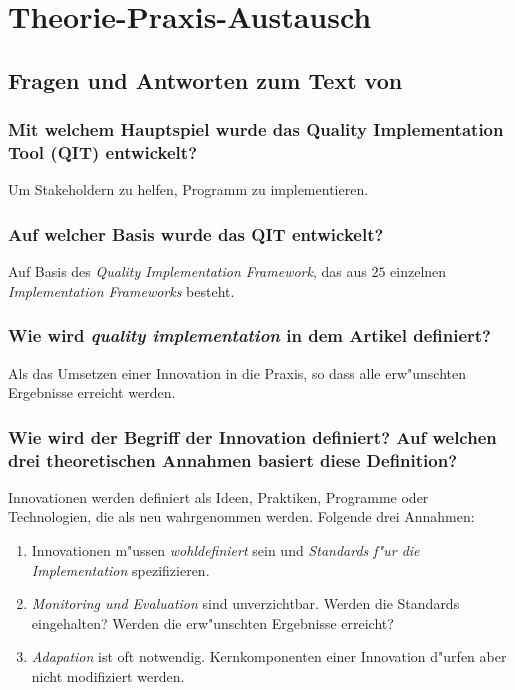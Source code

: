 \section{Theorie-Praxis-Austausch}
\subsection{Fragen und Antworten zum Text von \textcite{meyers_practical_2012}}
\subsubsection{Mit welchem Hauptspiel wurde das Quality Implementation Tool (QIT) entwickelt?}
Um Stakeholdern zu helfen, Programm zu implementieren.

\subsubsection{Auf welcher Basis wurde das QIT entwickelt?}
Auf Basis des \emph{Quality Implementation Framework}, das aus $25$ einzelnen \emph{Implementation Frameworks} besteht.

\subsubsection{Wie wird \emph{quality implementation} in dem Artikel definiert?}
Als das Umsetzen einer Innovation in die Praxis, so dass alle erw"unschten Ergebnisse erreicht werden.

\subsubsection{Wie wird der Begriff der Innovation definiert? Auf welchen drei theoretischen Annahmen basiert diese Definition?}
Innovationen werden definiert als Ideen, Praktiken, Programme oder Technologien, die als neu wahrgenommen werden. Folgende drei Annahmen:
\begin{enumerate}
        \item Innovationen m"ussen \emph{wohldefiniert} sein und \emph{Standards f"ur die Implementation} spezifizieren.
        \item \emph{Monitoring und Evaluation} sind unverzichtbar. Werden die Standards eingehalten? Werden die erw"unschten Ergebnisse erreicht?
        \item \emph{Adapation} ist oft notwendig. Kernkomponenten einer Innovation d"urfen aber nicht modifiziert werden.
\end{enumerate}

